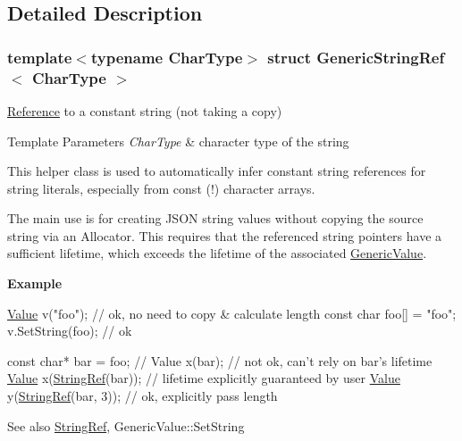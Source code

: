 \subsection{Detailed Description}
\subsubsection*{template$<$typename Char\+Type$>$\newline
struct Generic\+String\+Ref$<$ Char\+Type $>$}

\hyperlink{structReference}{Reference} to a constant string (not taking a copy) 


\begin{DoxyTemplParams}{Template Parameters}
{\em Char\+Type} & character type of the string\\
\hline
\end{DoxyTemplParams}
This helper class is used to automatically infer constant string references for string literals, especially from {\ttfamily const} {\bfseries }(!) character arrays.

The main use is for creating J\+S\+ON string values without copying the source string via an Allocator. This requires that the referenced string pointers have a sufficient lifetime, which exceeds the lifetime of the associated \hyperlink{classGenericValue}{Generic\+Value}.

{\bfseries Example} 
\begin{DoxyCode}
\hyperlink{classValue}{Value} v(\textcolor{stringliteral}{"foo"});   \textcolor{comment}{// ok, no need to copy & calculate length}
\textcolor{keyword}{const} \textcolor{keywordtype}{char} foo[] = \textcolor{stringliteral}{"foo"};
v.SetString(foo); \textcolor{comment}{// ok}

\textcolor{keyword}{const} \textcolor{keywordtype}{char}* bar = foo;
\textcolor{comment}{// Value x(bar); // not ok, can't rely on bar's lifetime}
\hyperlink{classValue}{Value} x(\hyperlink{structGenericStringRef_aa6b9fd9f6aa49405a574c362ba9af6b5}{StringRef}(bar)); \textcolor{comment}{// lifetime explicitly guaranteed by user}
\hyperlink{classValue}{Value} y(\hyperlink{structGenericStringRef_aa6b9fd9f6aa49405a574c362ba9af6b5}{StringRef}(bar, 3));  \textcolor{comment}{// ok, explicitly pass length}
\end{DoxyCode}


\begin{DoxySeeAlso}{See also}
\hyperlink{structGenericStringRef_aa6b9fd9f6aa49405a574c362ba9af6b5}{String\+Ref}, Generic\+Value\+::\+Set\+String 
\end{DoxySeeAlso}


